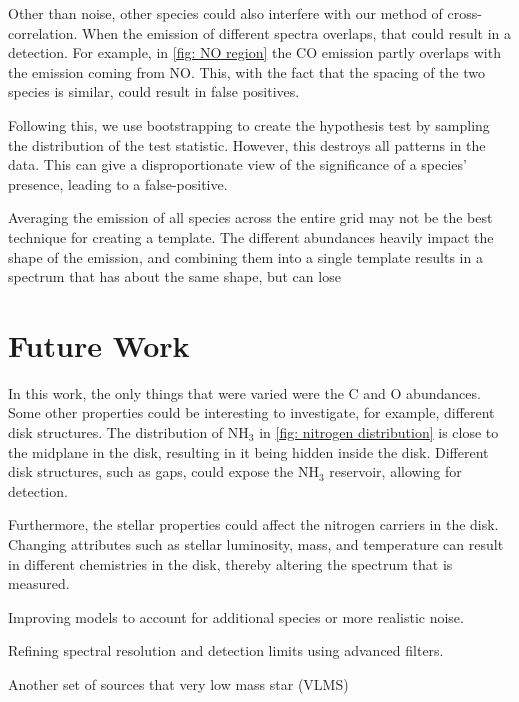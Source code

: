 \documentclass[oneside, single, authoryear, semicolon, 12pt]{lion-msc}
\newcommand{\4}{$_4$}
\newcommand{\3}{$_3$}
\newcommand{\2}{$_2$}
\begin{document}
Other than noise, other species could also interfere with our method of cross-correlation. When the emission of different spectra overlaps, that could result in a detection. For example, in \autoref{fig: NO region} the CO emission partly overlaps with the emission coming from NO. This, with the fact that the spacing of the two species is similar, could result in false positives. 

Following this, we use bootstrapping to create the hypothesis test by sampling the distribution of the test statistic. However, this destroys all patterns in the data. This can give a disproportionate view of the significance of a species' presence, leading to a false-positive.

Averaging the emission of all species across the entire grid may not be the best technique for creating a template. The different abundances heavily impact the shape of the emission, and combining them into a single template results in a spectrum that has about the same shape, but can lose 

\section{Future Work}
In this work, the only things that were varied were the C and O abundances. Some other properties could be interesting to investigate, for example, different disk structures. The distribution of NH\3 in \autoref{fig: nitrogen distribution} is close to the midplane in the disk, resulting in it being hidden inside the disk. Different disk structures, such as gaps, could expose the NH\3 reservoir, allowing for detection. 

Furthermore, the stellar properties could affect the nitrogen carriers in the disk. Changing attributes such as stellar luminosity, mass, and temperature can result in different chemistries in the disk, thereby altering the spectrum that is measured. 

Improving models to account for additional species or more realistic noise.

Refining spectral resolution and detection limits using advanced filters.

Another set of sources that very low mass star (VLMS) \citep{Arabhavi_2024}
\end{document}
